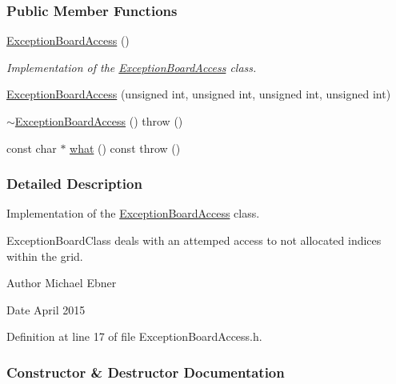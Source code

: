 \subsubsection*{Public Member Functions}
\begin{DoxyCompactItemize}
\item 
\hyperlink{a00025_aa864d06f1a6a563094e4702117a24ef9}{Exception\+Board\+Access} ()
\begin{DoxyCompactList}\small\item\em Implementation of the \hyperlink{a00025}{Exception\+Board\+Access} class. \end{DoxyCompactList}\item 
\hyperlink{a00025_ac74254590449f2caf42ddeab4cd64804}{Exception\+Board\+Access} (unsigned int, unsigned int, unsigned int, unsigned int)
\item 
\hyperlink{a00025_a8b13c53adf654c8eb5dff15a5c933a4e}{$\sim$\+Exception\+Board\+Access} ()  throw ()
\item 
const char $\ast$ \hyperlink{a00025_a83adedae573565dbe85fb0b048302808}{what} () const   throw ()
\end{DoxyCompactItemize}


\subsubsection{Detailed Description}
Implementation of the \hyperlink{a00025}{Exception\+Board\+Access} class. 

Exception\+Board\+Class deals with an attemped access to not allocated indices within the grid.

\begin{DoxyAuthor}{Author}
Michael Ebner 
\end{DoxyAuthor}
\begin{DoxyDate}{Date}
April 2015 
\end{DoxyDate}


Definition at line 17 of file Exception\+Board\+Access.\+h.



\subsubsection{Constructor \& Destructor Documentation}
\hypertarget{a00025_aa864d06f1a6a563094e4702117a24ef9}{}
